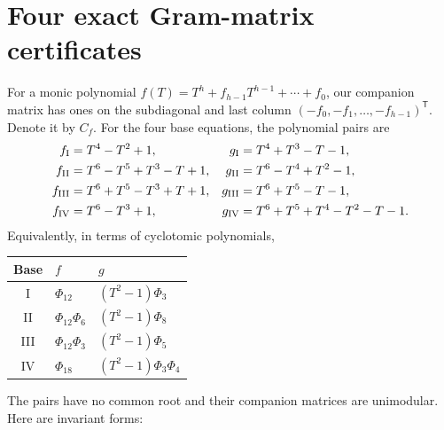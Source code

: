 \documentclass[11pt]{article}
\theoremstyle{definition}
\theoremstyle{remark}
\begin{document}
\section{Four exact Gram-matrix certificates}\label{ffd:sec:gram}
For a monic polynomial $f(T)=T^h+f_{h-1}T^{h-1}+\cdots+f_0$, our companion
matrix has ones on the subdiagonal and last column
$(-f_0,-f_1,\ldots,-f_{h-1})^{\mathsf T}$. Denote it by $C_f$.
For the four base equations, the polynomial pairs are
\begin{align}
 f_{\rm I}&=T^4-T^2+1,&
 g_{\rm I}&=T^4+T^3-T-1,\label{ffd:eq:polycerts}\\
 f_{\rm II}&=T^6-T^5+T^3-T+1,&
 g_{\rm II}&=T^6-T^4+T^2-1,\nonumber\\
 f_{\rm III}&=T^6+T^5-T^3+T+1,&
 g_{\rm III}&=T^6+T^5-T-1,\nonumber\\
 f_{\rm IV}&=T^6-T^3+1,&
 g_{\rm IV}&=T^6+T^5+T^4-T^2-T-1.\nonumber
\end{align}
Equivalently, in terms of cyclotomic polynomials,
\begin{center}
\begin{tabular}{cll}
\toprule
Base &$f$&$g$\\
\midrule
I&$\Phi_{12}$&$(T^2-1)\Phi_3$\\
II&$\Phi_{12}\Phi_6$&$(T^2-1)\Phi_8$\\
III&$\Phi_{12}\Phi_3$&$(T^2-1)\Phi_5$\\
IV&$\Phi_{18}$&$(T^2-1)\Phi_3\Phi_4$\\
\bottomrule
\end{tabular}
\end{center}
The pairs have no common root and their companion matrices are unimodular.
Here are invariant forms:
\end{document}
